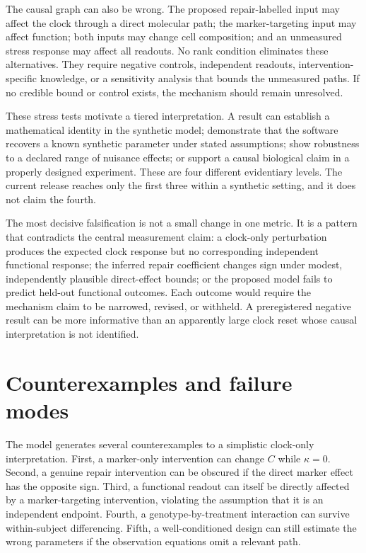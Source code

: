\documentclass[10pt,a4paper]{article}
\begin{document}
The causal graph can also be wrong. The proposed repair-labelled input may affect the clock through a direct molecular path; the marker-targeting input may affect function; both inputs may change cell composition; and an unmeasured stress response may affect all readouts. No rank condition eliminates these alternatives. They require negative controls, independent readouts, intervention-specific knowledge, or a sensitivity analysis that bounds the unmeasured paths. If no credible bound or control exists, the mechanism should remain unresolved.

These stress tests motivate a tiered interpretation. A result can establish a mathematical identity in the synthetic model; demonstrate that the software recovers a known synthetic parameter under stated assumptions; show robustness to a declared range of nuisance effects; or support a causal biological claim in a properly designed experiment. These are four different evidentiary levels. The current release reaches only the first three within a synthetic setting, and it does not claim the fourth.

The most decisive falsification is not a small change in one metric. It is a pattern that contradicts the central measurement claim: a clock-only perturbation produces the expected clock response but no corresponding independent functional response; the inferred repair coefficient changes sign under modest, independently plausible direct-effect bounds; or the proposed model fails to predict held-out functional outcomes. Each outcome would require the mechanism claim to be narrowed, revised, or withheld. A preregistered negative result can be more informative than an apparently large clock reset whose causal interpretation is not identified.


\section{Counterexamples and failure modes}
The model generates several counterexamples to a simplistic clock-only interpretation. First, a marker-only intervention can change \(C\) while \(\kappa=0\). Second, a genuine repair intervention can be obscured if the direct marker effect has the opposite sign. Third, a functional readout can itself be directly affected by a marker-targeting intervention, violating the assumption that it is an independent endpoint. Fourth, a genotype-by-treatment interaction can survive within-subject differencing. Fifth, a well-conditioned design can still estimate the wrong parameters if the observation equations omit a relevant path.
\end{document}

